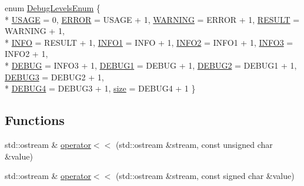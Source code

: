 \begin{DoxyCompactItemize}
\item 
enum \hyperlink{namespaceuva_1_1smt_1_1logging_ab82295a1c88a9605285d504893855427}{Debug\+Levels\+Enum} \{ \\*
\hyperlink{namespaceuva_1_1smt_1_1logging_ab82295a1c88a9605285d504893855427abc4ba61d2ee3433dd43040f17603bf6a}{U\+S\+A\+G\+E} = 0, 
\hyperlink{namespaceuva_1_1smt_1_1logging_ab82295a1c88a9605285d504893855427afe62f43ec1d0249d8c3a20e61911d469}{E\+R\+R\+O\+R} = U\+S\+A\+G\+E + 1, 
\hyperlink{namespaceuva_1_1smt_1_1logging_ab82295a1c88a9605285d504893855427a87b82af01a3dab361757373d1ac96254}{W\+A\+R\+N\+I\+N\+G} = E\+R\+R\+O\+R + 1, 
\hyperlink{namespaceuva_1_1smt_1_1logging_ab82295a1c88a9605285d504893855427a65835a56f97da1994648f6dbd331434c}{R\+E\+S\+U\+L\+T} = W\+A\+R\+N\+I\+N\+G + 1, 
\\*
\hyperlink{namespaceuva_1_1smt_1_1logging_ab82295a1c88a9605285d504893855427a4a97ea4af2faeed51be5b2d86a4dc412}{I\+N\+F\+O} = R\+E\+S\+U\+L\+T + 1, 
\hyperlink{namespaceuva_1_1smt_1_1logging_ab82295a1c88a9605285d504893855427a3b0f5996700bbed54d2955cbbf51474b}{I\+N\+F\+O1} = I\+N\+F\+O + 1, 
\hyperlink{namespaceuva_1_1smt_1_1logging_ab82295a1c88a9605285d504893855427ad9ab770ecdf8350e187499ffb78e5889}{I\+N\+F\+O2} = I\+N\+F\+O1 + 1, 
\hyperlink{namespaceuva_1_1smt_1_1logging_ab82295a1c88a9605285d504893855427ad144a114395be2fbab1842546f43838f}{I\+N\+F\+O3} = I\+N\+F\+O2 + 1, 
\\*
\hyperlink{namespaceuva_1_1smt_1_1logging_ab82295a1c88a9605285d504893855427a468f7ffe98602bcc4ac492864962db6b}{D\+E\+B\+U\+G} = I\+N\+F\+O3 + 1, 
\hyperlink{namespaceuva_1_1smt_1_1logging_ab82295a1c88a9605285d504893855427a5260d029494a201a9f18d708269383a3}{D\+E\+B\+U\+G1} = D\+E\+B\+U\+G + 1, 
\hyperlink{namespaceuva_1_1smt_1_1logging_ab82295a1c88a9605285d504893855427a57f472de9c68a00be7ff70927dce8b61}{D\+E\+B\+U\+G2} = D\+E\+B\+U\+G1 + 1, 
\hyperlink{namespaceuva_1_1smt_1_1logging_ab82295a1c88a9605285d504893855427a519f73a492f6ca4fd4aa771e5bb0d055}{D\+E\+B\+U\+G3} = D\+E\+B\+U\+G2 + 1, 
\\*
\hyperlink{namespaceuva_1_1smt_1_1logging_ab82295a1c88a9605285d504893855427a88065d5c090d82ee7f841aa4d398597d}{D\+E\+B\+U\+G4} = D\+E\+B\+U\+G3 + 1, 
\hyperlink{namespaceuva_1_1smt_1_1logging_ab82295a1c88a9605285d504893855427ab936d4b8df6cd3759aa62953806d60bf}{size} = D\+E\+B\+U\+G4 + 1
 \}
\end{DoxyCompactItemize}
\subsection*{Functions}
\begin{DoxyCompactItemize}
\item 
std\+::ostream \& \hyperlink{namespaceuva_1_1smt_1_1logging_a52925bfdd67d50636e8b6c39e42e5182}{operator$<$$<$} (std\+::ostream \&stream, const unsigned char \&value)
\item 
std\+::ostream \& \hyperlink{namespaceuva_1_1smt_1_1logging_a7cf869bb93be387339ccaff6faaf7ecf}{operator$<$$<$} (std\+::ostream \&stream, const signed char \&value)
\end{DoxyCompactItemize}
